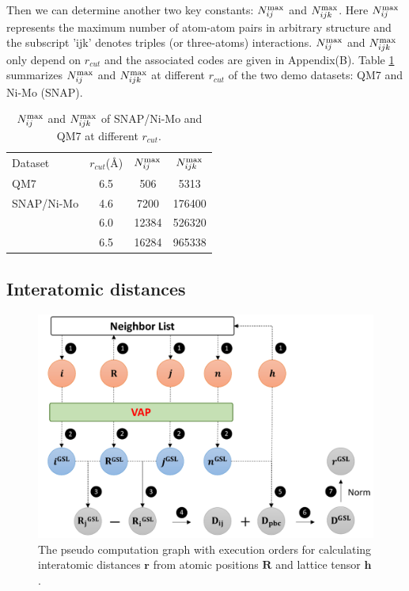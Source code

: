\documentclass[preprint]{revtex4-2}
\begin{document}
Then we can determine another two key constants: $N_{ij}^{\mathrm{max}}$ and $N_{ijk}^{\mathrm{max}}$. 
Here $N_{ij}^{\mathrm{max}}$ represents the maximum number of atom-atom pairs in
arbitrary structure and the subscript 'ijk' denotes triples 
(or three-atoms) interactions. $N_{ij}^{\mathrm{max}}$ and $N_{ijk}^{\mathrm{max}}$ only depend on 
$r_{cut}$ and the associated codes are given in Appendix(B). 
Table \ref{table:nij_nijk_max} summarizes $N_{ij}^{\mathrm{max}}$ and $N_{ijk}^{\mathrm{max}}$ at different
$r_{cut}$ of the two demo datasets: QM7 and Ni-Mo (SNAP).

% 
%
\begin{table}[h]
\centering
\begin{tabular}{lccc}
\hline
 Dataset & $r_{cut}$(\AA) & $N_{ij}^{\mathrm{max}}$ & $N_{ijk}^{\mathrm{max}}$ \\
 QM7 & 6.5 & 506 & 5313 \\
\hline
 SNAP/Ni-Mo &  4.6 & 7200 & 176400 \\
 & 6.0 & 12384 & 526320 \\
 & 6.5 & 16284 & 965338 \\
\hline
\hline
\end{tabular}
\caption{\label{table:nij_nijk_max}
$N_{ij}^{\mathrm{max}}$ and $N_{ijk}^{\mathrm{max}}$ of SNAP/Ni-Mo and QM7 at different $r_{cut}$.
}
\end{table}

% 
%
\subsection{Interatomic distances}
\label{section:interatomic_distance}

% 
%
\begin{figure}[h!]
\centering
\includegraphics[scale=0.6]{figures/Fig3.pdf}
\caption{\label{fig:Fig3} The pseudo computation graph with execution orders for 
calculating interatomic distances $\mathbf{r}$ from atomic positions 
$\mathbf{R}$ and lattice tensor $\mathbf{h}$.
}
\end{figure}
\end{document}
